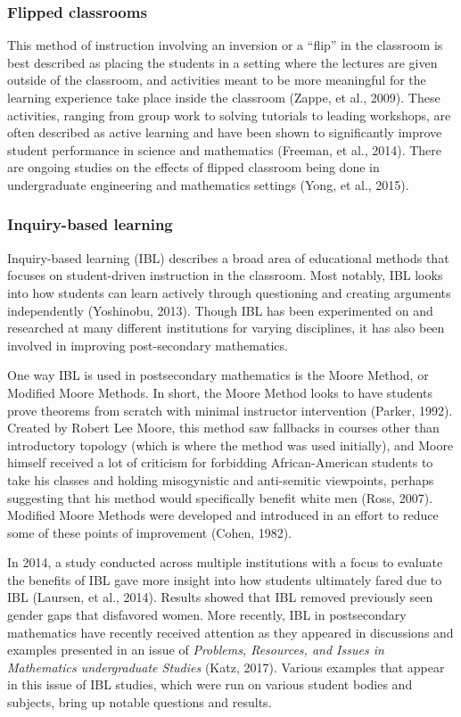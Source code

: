 \subsubsection{Flipped classrooms}
This method of instruction involving an inversion or a ``flip'' in the classroom is best described as placing the students in a setting where the lectures are given outside of the classroom, and activities meant to be more meaningful for the learning experience take place inside the classroom (Zappe, et al., 2009). These activities, ranging from group work to solving tutorials to leading workshops, are often described as active learning and have been shown to significantly improve student performance in science and mathematics (Freeman, et al., 2014). There are ongoing studies on the effects of flipped classroom being done in undergraduate engineering and mathematics settings (Yong, et al., 2015).

\subsubsection{Inquiry-based learning}
Inquiry-based learning (IBL) describes a broad area of educational methods that focuses on student-driven instruction in the classroom. Most notably, IBL looks into how students can learn actively through questioning and creating arguments independently (Yoshinobu, 2013). Though IBL has been experimented on and researched at many different institutions for varying disciplines, it has also been involved in improving post-secondary mathematics.

One way IBL is used in postsecondary mathematics is the Moore Method, or Modified Moore Methods. In short, the Moore Method looks to have students prove theorems from scratch with minimal instructor intervention (Parker, 1992). Created by Robert Lee Moore, this method saw fallbacks in courses other than introductory topology (which is where the method was used initially), and Moore himself received a lot of criticism for forbidding African-American students to take his classes and holding misogynistic and anti-semitic viewpoints, perhaps suggesting that his method would specifically benefit white men (Ross, 2007). Modified Moore Methods were developed and introduced in an effort to reduce some of these points of improvement (Cohen, 1982).

In 2014, a study conducted across multiple institutions with a focus to evaluate the benefits of IBL gave more insight into how students ultimately fared due to IBL (Laursen, et al., 2014). Results showed that IBL removed previously seen gender gaps that disfavored women. More recently, IBL in postsecondary mathematics have recently received attention as they appeared in discussions and examples presented in an issue of {\it Problems, Resources, and Issues in Mathematics undergraduate Studies} (Katz, 2017). Various examples that appear in this issue of IBL studies, which were run on various student bodies and subjects, bring up notable questions and results.

